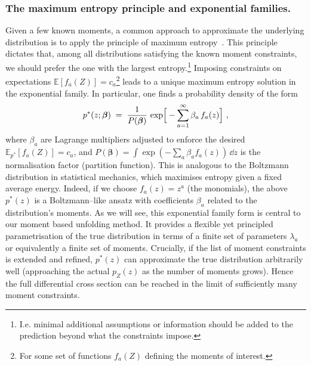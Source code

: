 {{        \subsubsection{The maximum entropy principle and exponential families.}
            Given a few known moments, a common approach to approximate the underlying distribution is to apply the principle of maximum entropy~\cite{Matzke:275528}.
            This principle dictates that, among all distributions satisfying the known moment constraints, we should prefer the one with the largest entropy.\footnote{I.e. minimal additional assumptions or information should be added to the prediction beyond what the constraints impose.}
            Imposing constraints on expectations $\mathbb{E}[f_a(Z)] = c_a$\footnote{For some set of functions $f_a(Z)$ defining the moments of interest.} leads to a unique maximum entropy solution in the exponential family.
            In particular, one finds a probability density of the form
            \[
                \label{eq:infinite-generator}
                p^*(z; \vb*\beta) \;=\; \frac{1}{P(\boldsymbol{\beta})}\,\exp\!\Big[-\sum_{a=1}^\infty\beta_a\,f_a(z)\Big]~,
            \]
            where $\beta_a$ are Lagrange multipliers adjusted to enforce the desired $\mathbb{E}_{p^*}[f_a(Z)] = c_a$, and $P(\boldsymbol{\beta}) = \int \exp(-\sum_a \beta_a f_a(z))\,\dd z$ is the normalisation factor (partition function).
            This is analogous to the Boltzmann distribution in statistical mechanics, which maximises entropy given a fixed average energy.
            Indeed, if we choose $f_a(z) = z^a$ (the monomials), the above $p^*(z)$ is a Boltzmann--like ansatz with coefficients $\beta_a$ related to the distribution's moments.
            As we will see, this exponential family form is central to our moment based unfolding method.
            It provides a flexible yet principled parametrisation of the true distribution in terms of a finite set of parameters ${\lambda_a}$ or equivalently a finite set of moments.
            Crucially, if the list of moment constraints is extended and refined, $p^*(z)$ can approximate the true distribution arbitrarily well (approaching the actual $p_Z(z)$ as the number of moments grows).
            Hence the full differential cross section can be reached in the limit of sufficiently many moment constraints.

}}
